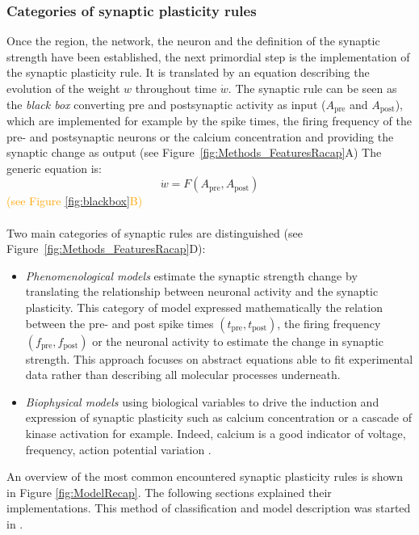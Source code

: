 \subsubsection{Categories of synaptic plasticity rules}
Once the region, the network, the neuron and the definition of the synaptic strength have been established, the next primordial step is the implementation of the synaptic plasticity rule. It is translated by an equation describing the evolution of the weight $w$ throughout time $\dot{w}$. The synaptic rule can be seen as the \textit{black box} converting pre and postsynaptic activity as input ($A_{\mathrm{pre}}$ and $A_{\mathrm{post}}$), which are implemented for example by the spike times, the firing frequency of the pre- and postsynaptic neurons or the calcium concentration and providing the synaptic change as output (see Figure~\ref{fig:Methods_FeaturesRacap}A)  The generic equation is:
$$ \dot{w} = F(A_{\mathrm{pre}}, A_{\mathrm{post}})$$
\textcolor{orange}{(see Figure \ref{fig:blackbox}B)}\\

~\\
Two main categories of synaptic rules are distinguished \citep{shouval_models_2007, graupner_synaptic_2017, clopath_long-term_2019}(see Figure~\ref{fig:Methods_FeaturesRacap}D): 
\begin{itemize}
    \item \textit{Phenomenological models} estimate the synaptic strength change by translating the relationship between neuronal activity and the synaptic plasticity. This category of model expressed mathematically the relation between the pre- and post spike times $(t_{\mathrm{pre}}, t_{\mathrm{post}})$, the firing frequency $(f_{\mathrm{pre}}, f_{\mathrm{post}})$ or the neuronal activity  to estimate the change in synaptic strength. This approach focuses on abstract equations able to fit experimental data rather than describing all molecular processes underneath.
    \item \textit{Biophysical models} using biological variables to drive the induction and expression of synaptic plasticity such as calcium concentration or a cascade of kinase activation for example. Indeed, calcium is a good indicator of voltage, frequency, action potential variation \citep{feldman_spike-timing_2012}.
\end{itemize}

An overview of the most common encountered synaptic plasticity rules is shown in Figure \ref{fig:ModelRecap}. The following sections explained their implementations. This method of classification and model description was started in \citep{clopath_long-term_2019}. 



